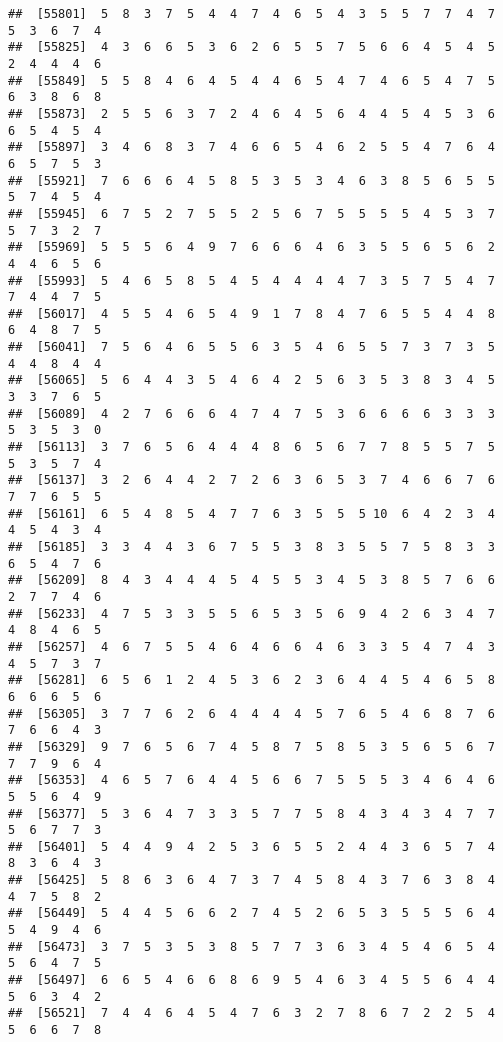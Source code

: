 \documentclass[
]{book}
\begin{document}
\begin{verbatim}
##  [55801]  5  8  3  7  5  4  4  7  4  6  5  4  3  5  5  7  7  4  7  5  3  6  7  4
##  [55825]  4  3  6  6  5  3  6  2  6  5  5  7  5  6  6  4  5  4  5  2  4  4  4  6
##  [55849]  5  5  8  4  6  4  5  4  4  6  5  4  7  4  6  5  4  7  5  6  3  8  6  8
##  [55873]  2  5  5  6  3  7  2  4  6  4  5  6  4  4  5  4  5  3  6  6  5  4  5  4
##  [55897]  3  4  6  8  3  7  4  6  6  5  4  6  2  5  5  4  7  6  4  6  5  7  5  3
##  [55921]  7  6  6  6  4  5  8  5  3  5  3  4  6  3  8  5  6  5  5  5  7  4  5  4
##  [55945]  6  7  5  2  7  5  5  2  5  6  7  5  5  5  5  4  5  3  7  5  7  3  2  7
##  [55969]  5  5  5  6  4  9  7  6  6  6  4  6  3  5  5  6  5  6  2  4  4  6  5  6
##  [55993]  5  4  6  5  8  5  4  5  4  4  4  4  7  3  5  7  5  4  7  7  4  4  7  5
##  [56017]  4  5  5  4  6  5  4  9  1  7  8  4  7  6  5  5  4  4  8  6  4  8  7  5
##  [56041]  7  5  6  4  6  5  5  6  3  5  4  6  5  5  7  3  7  3  5  4  4  8  4  4
##  [56065]  5  6  4  4  3  5  4  6  4  2  5  6  3  5  3  8  3  4  5  3  3  7  6  5
##  [56089]  4  2  7  6  6  6  4  7  4  7  5  3  6  6  6  6  3  3  3  5  3  5  3  0
##  [56113]  3  7  6  5  6  4  4  4  8  6  5  6  7  7  8  5  5  7  5  5  3  5  7  4
##  [56137]  3  2  6  4  4  2  7  2  6  3  6  5  3  7  4  6  6  7  6  7  7  6  5  5
##  [56161]  6  5  4  8  5  4  7  7  6  3  5  5  5 10  6  4  2  3  4  4  5  4  3  4
##  [56185]  3  3  4  4  3  6  7  5  5  3  8  3  5  5  7  5  8  3  3  6  5  4  7  6
##  [56209]  8  4  3  4  4  4  5  4  5  5  3  4  5  3  8  5  7  6  6  2  7  7  4  6
##  [56233]  4  7  5  3  3  5  5  6  5  3  5  6  9  4  2  6  3  4  7  4  8  4  6  5
##  [56257]  4  6  7  5  5  4  6  4  6  6  4  6  3  3  5  4  7  4  3  4  5  7  3  7
##  [56281]  6  5  6  1  2  4  5  3  6  2  3  6  4  4  5  4  6  5  8  6  6  6  5  6
##  [56305]  3  7  7  6  2  6  4  4  4  4  5  7  6  5  4  6  8  7  6  7  6  6  4  3
##  [56329]  9  7  6  5  6  7  4  5  8  7  5  8  5  3  5  6  5  6  7  7  7  9  6  4
##  [56353]  4  6  5  7  6  4  4  5  6  6  7  5  5  5  3  4  6  4  6  5  5  6  4  9
##  [56377]  5  3  6  4  7  3  3  5  7  7  5  8  4  3  4  3  4  7  7  5  6  7  7  3
##  [56401]  5  4  4  9  4  2  5  3  6  5  5  2  4  4  3  6  5  7  4  8  3  6  4  3
##  [56425]  5  8  6  3  6  4  7  3  7  4  5  8  4  3  7  6  3  8  4  4  7  5  8  2
##  [56449]  5  4  4  5  6  6  2  7  4  5  2  6  5  3  5  5  5  6  4  5  4  9  4  6
##  [56473]  3  7  5  3  5  3  8  5  7  7  3  6  3  4  5  4  6  5  4  5  6  4  7  5
##  [56497]  6  6  5  4  6  6  8  6  9  5  4  6  3  4  5  5  6  4  4  5  6  3  4  2
##  [56521]  7  4  4  6  4  5  4  7  6  3  2  7  8  6  7  2  2  5  4  5  6  6  7  8

\end{verbatim}
\end{document}
